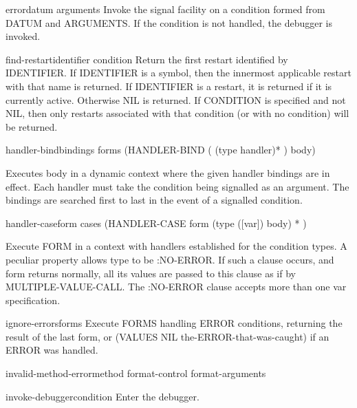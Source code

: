 \begin{function}{error}{datum \rest arguments}{}
  Invoke the signal facility on a condition formed from DATUM and ARGUMENTS.
  If the condition is not handled, the debugger is invoked.
\end{function}

\begin{function}{find-restart}{identifier \op condition}{}
  Return the first restart identified by IDENTIFIER. If IDENTIFIER is a symbol,
then the innermost applicable restart with that name is returned. If IDENTIFIER
is a restart, it is returned if it is currently active. Otherwise NIL is
returned. If CONDITION is specified and not NIL, then only restarts associated
with that condition (or with no condition) will be returned.
\end{function}

\begin{macro}{handler-bind}{bindings \body forms}{}
  (HANDLER-BIND ( {(type handler)}* )  body)

Executes body in a dynamic context where the given handler bindings are in
effect. Each handler must take the condition being signalled as an argument.
The bindings are searched first to last in the event of a signalled
condition.
\end{macro}

\begin{macro}{handler-case}{form \rest cases}{}
  (HANDLER-CASE form { (type ([var]) body) }* )

Execute FORM in a context with handlers established for the condition types. A
peculiar property allows type to be :NO-ERROR. If such a clause occurs, and
form returns normally, all its values are passed to this clause as if by
MULTIPLE-VALUE-CALL. The :NO-ERROR clause accepts more than one var
specification.
\end{macro}

\begin{macro}{ignore-errors}{\rest forms}{}
  Execute FORMS handling ERROR conditions, returning the result of the last
  form, or (VALUES NIL the-ERROR-that-was-caught) if an ERROR was handled.
\end{macro}

\begin{function}{invalid-method-error}{method format-control \rest format-arguments}{}
  
\end{function}

\begin{function}{invoke-debugger}{condition}{}
  Enter the debugger.
\end{function}


